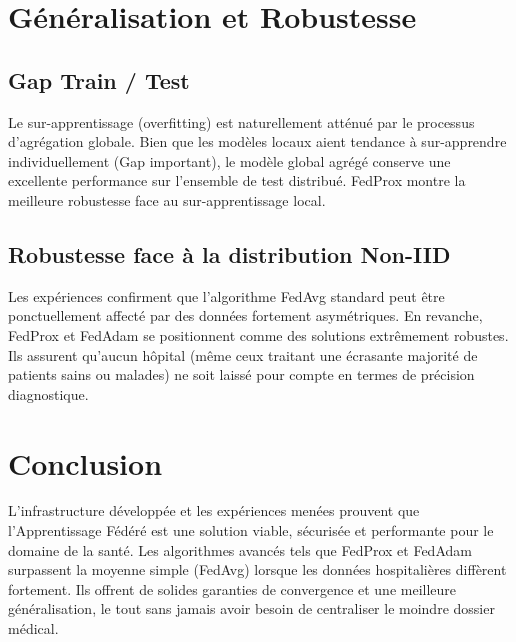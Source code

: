 \documentclass[12pt,a4paper]{article}
\begin{document}
\section{Généralisation et Robustesse}

\subsection{Gap Train / Test}
Le sur-apprentissage (overfitting) est naturellement atténué par le processus d'agrégation globale. Bien que les modèles locaux aient tendance à sur-apprendre individuellement (Gap important), le modèle global agrégé conserve une excellente performance sur l'ensemble de test distribué. FedProx montre la meilleure robustesse face au sur-apprentissage local.

\subsection{Robustesse face à la distribution Non-IID}
Les expériences confirment que l'algorithme FedAvg standard peut être ponctuellement affecté par des données fortement asymétriques. En revanche, FedProx et FedAdam se positionnent comme des solutions extrêmement robustes. Ils assurent qu'aucun hôpital (même ceux traitant une écrasante majorité de patients sains ou malades) ne soit laissé pour compte en termes de précision diagnostique.

\section{Conclusion}
L'infrastructure développée et les expériences menées prouvent que l'Apprentissage Fédéré est une solution viable, sécurisée et performante pour le domaine de la santé. Les algorithmes avancés tels que FedProx et FedAdam surpassent la moyenne simple (FedAvg) lorsque les données hospitalières diffèrent fortement. Ils offrent de solides garanties de convergence et une meilleure généralisation, le tout sans jamais avoir besoin de centraliser le moindre dossier médical.
\end{document}
